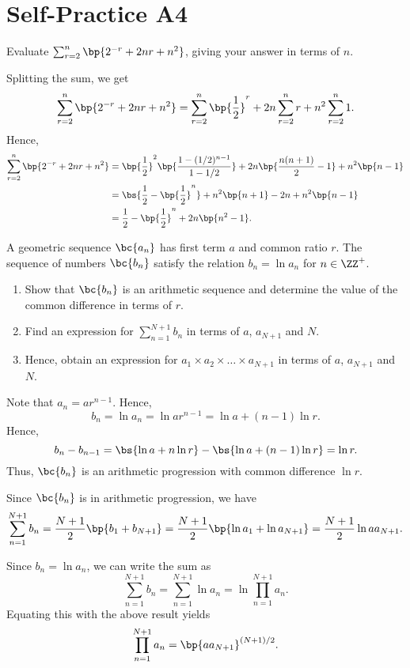 \section{Self-Practice A4}

\begin{problem}
    Evaluate $\sum_{r = 2}^n \bp{2^{-r} + 2nr + n^2}$, giving your answer in terms of $n$.
\end{problem}
\begin{solution}
    Splitting the sum, we get \[\sum_{r = 2}^n \bp{2^{-r} + 2nr + n^2} = \sum_{r = 2}^n \bp{\frac12}^r + 2n \sum_{r = 2}^n r + n^2 \sum_{r = 2}^n 1.\] Hence,
    \begin{align*}
        \sum_{r = 2}^n  \bp{2^{-r} + 2nr + n^2} &= \bp{\frac12}^2 \bp{\frac{1 - (1/2)^{n-1}}{1 - 1/2}} + 2n \bp{\frac{n(n+1)}{2} - 1} + n^2 \bp{n - 1}\\
        &= \bs{\frac12 - \bp{\frac12}^n} + n^2 \bp{n+1} - 2n + n^2 \bp{n-1}\\
        &= \frac12 - \bp{\frac12}^n + 2n \bp{n^2 - 1}.
    \end{align*}
\end{solution}

\begin{problem}
    A geometric sequence $\bc{a_n}$ has first term $a$ and common ratio $r$. The sequence of numbers $\bc{b_n}$ satisfy the relation $b_n = \ln{a_n}$ for $n \in \ZZ^+$.

    \begin{enumerate}
        \item Show that $\bc{b_n}$ is an arithmetic sequence and determine the value of the common difference in terms of $r$.
        \item Find an expression for $\sum_{n = 1}^{N+1} b_n$ in terms of $a$, $a_{N+1}$ and $N$.
        \item Hence, obtain an expression for $a_1 \times a_2 \times \dots \times a_{N+1}$ in terms of $a$, $a_{N+1}$ and $N$.
    \end{enumerate}
\end{problem}
\begin{solution}
    \begin{ppart}
        Note that $a_n = ar^{n-1}$. Hence, \[b_n = \ln a_n = \ln{ar^{n-1}} = \ln a + (n-1) \ln r.\] Hence, \[b_n - b_{n-1} = \bs{\ln a + n \ln r} - \bs{\ln a + (n-1) \ln r} = \ln r.\] Thus, $\bc{b_n}$ is an arithmetic progression with common difference $\ln r$.
    \end{ppart}
    \begin{ppart}
        Since $\bc{b_n}$ is in arithmetic progression, we have \[\sum_{n = 1}^{N+1} b_n = \frac{N+1}{2} \bp{b_1 + b_{N+1}} = \frac{N+1}{2} \bp{\ln a_1 + \ln a_{N+1}} = \frac{N+1}{2} \ln{a a_{N+1}}.\]
    \end{ppart}
    \begin{ppart}
        Since $b_n = \ln a_n$, we can write the sum as \[\sum_{n = 1}^{N+1} b_n = \sum_{n = 1}^{N+1} \ln a_n = \ln \prod_{n = 1}^{N+1} a_n.\] Equating this with the above result yields \[\prod_{n = 1}^{N+1} a_n = \bp{a a_{N+1}}^{(N+1)/2}.\]
    \end{ppart}
\end{solution}

